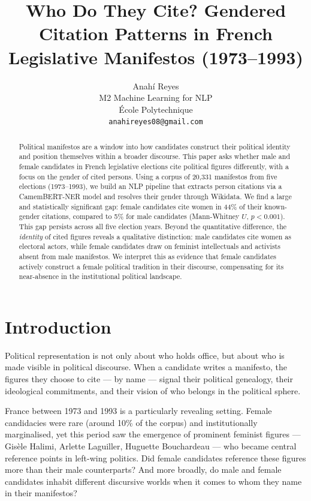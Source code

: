 \documentclass{article}
\title{Who Do They Cite? Gendered Citation Patterns in French Legislative Manifestos (1973--1993)}
\author{%
  Anahí Reyes \\
  M2 Machine Learning for NLP \\
  École Polytechnique \\
  \texttt{anahireyes08@gmail.com}
}
\begin{document}
\maketitle

\begin{abstract}
Political manifestos are a window into how candidates construct their political identity
and position themselves within a broader discourse. This paper asks whether male and
female candidates in French legislative elections cite political figures differently,
with a focus on the gender of cited persons. Using a corpus of 20,331 manifestos from
five elections (1973--1993), we build an NLP pipeline that extracts person citations
via a CamemBERT-NER model and resolves their gender through Wikidata. We find a
large and statistically significant gap: female candidates cite women in 44\% of their
known-gender citations, compared to 5\% for male candidates
(Mann-Whitney $U$, $p < 0.001$). This gap persists across all five election years.
Beyond the quantitative difference, the \emph{identity} of cited figures reveals a
qualitative distinction: male candidates cite women as electoral actors, while female
candidates draw on feminist intellectuals and activists absent from male manifestos.
We interpret this as evidence that female candidates actively construct a female
political tradition in their discourse, compensating for its near-absence in the
institutional political landscape.
\end{abstract}


\section{Introduction}

Political representation is not only about who holds office, but about who is made
visible in political discourse. When a candidate writes a manifesto, the figures they
choose to cite — by name — signal their political genealogy, their ideological
commitments, and their vision of who belongs in the political sphere.

France between 1973 and 1993 is a particularly revealing setting. Female candidacies
were rare (around 10\% of the corpus) and institutionally marginalised, yet this period
saw the emergence of prominent feminist figures — Gisèle Halimi, Arlette Laguiller,
Huguette Bouchardeau — who became central reference points in left-wing politics.
Did female candidates reference these figures more than their male counterparts?
And more broadly, do male and female candidates inhabit different discursive worlds
when it comes to whom they name in their manifestos?
\end{document}
